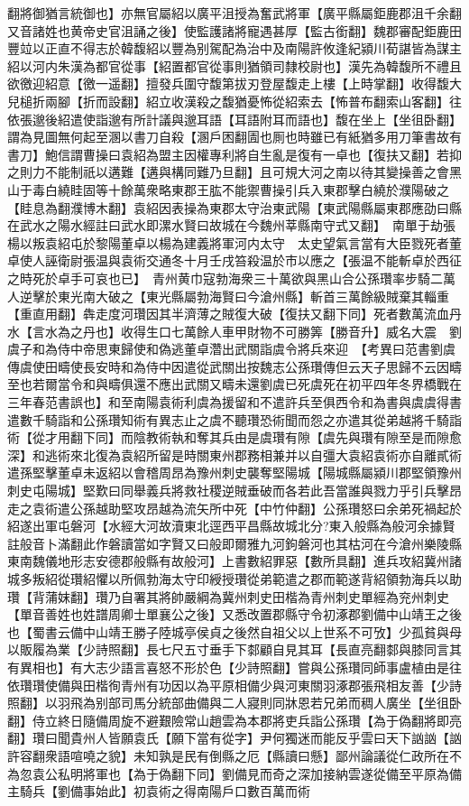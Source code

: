 翻將御猶言統御也】亦無官屬紹以廣平沮授為奮武將軍【廣平縣屬鉅鹿郡沮千余翻又音諸姓也黄帝史官沮誦之後】使監護諸將寵遇甚厚【監古銜翻】魏郡審配鉅鹿田豐竝以正直不得志於韓馥紹以豐為别駕配為治中及南陽許攸逢紀潁川荀諶皆為謀主紹以河内朱漢為都官從事【紹置都官從事則猶領司隸校尉也】漢先為韓馥所不禮且欲徼迎紹意【徼一遥翻】擅發兵圍守馥第拔刃登屋馥走上樓【上時掌翻】收得馥大兒槌折兩腳【折而設翻】紹立收漢殺之馥猶憂怖從紹索去【怖普布翻索山客翻】往依張邈後紹遣使詣邈有所計議與邈耳語【耳語附耳而語也】馥在坐上【坐徂卧翻】謂為見圖無何起至溷以書刀自殺【溷戶困翻圊也厠也時雖已有紙猶多用刀筆書故有書刀】鮑信謂曹操曰袁紹為盟主因權專利將自生亂是復有一卓也【復扶又翻】若抑之則力不能制祇以遘難【遘與構同難乃旦翻】且可規大河之南以待其變操善之會黑山于毒白繞眭固等十餘萬衆略東郡王肱不能禦曹操引兵入東郡擊白繞於濮陽破之【眭息為翻濮博木翻】袁紹因表操為東郡太守治東武陽【東武陽縣屬東郡應劭曰縣在武水之陽水經註曰武水即漯水賢曰故城在今魏州莘縣南守式又翻】　南單于劫張楊以叛袁紹屯於黎陽董卓以楊為建義將軍河内太守　太史望氣言當有大臣戮死者董卓使人誣衛尉張温與袁術交通冬十月壬戌笞殺温於市以應之【張温不能斬卓於西征之時死於卓手可哀也已】　青州黄巾寇勃海衆三十萬欲與黑山合公孫瓚率步騎二萬人逆擊於東光南大破之【東光縣屬勃海賢曰今滄州縣】斬首三萬餘級賊棄其輜重【重直用翻】犇走度河瓚因其半濟薄之賊復大破【復扶又翻下同】死者數萬流血丹水【言水為之丹也】收得生口七萬餘人車甲財物不可勝筭【勝音升】威名大震　劉虞子和為侍中帝思東歸使和偽逃董卓濳出武關詣虞令將兵來迎　【考異曰范書劉虞傳虞使田疇使長安時和為侍中因遣從武關出按魏志公孫瓚傳但云天子思歸不云因疇至也若爾當令和與疇俱還不應出武關又疇未還劉虞已死虞死在初平四年冬界橋戰在三年春范書誤也】和至南陽袁術利虞為援留和不遣許兵至俱西令和為書與虞虞得書遣數千騎詣和公孫瓚知術有異志止之虞不聽瓚恐術聞而怨之亦遣其從弟越將千騎詣術【從才用翻下同】而陰教術執和奪其兵由是虞瓚有隙【虞先與瓚有隙至是而隙愈深】和逃術來北復為袁紹所留是時關東州郡務相兼并以自彊大袁紹袁術亦自離貳術遣孫堅擊董卓未返紹以會稽周昂為豫州刺史襲奪堅陽城【陽城縣屬潁川郡堅領豫州刺史屯陽城】堅歎曰同舉義兵將救社稷逆賊垂破而各若此吾當誰與戮力乎引兵擊昂走之袁術遣公孫越助堅攻昂越為流矢所中死【中竹仲翻】公孫瓚怒曰余弟死禍起於紹遂出軍屯磐河【水經大河故瀆東北逕西平昌縣故城北分?東入般縣為般河余據賢註般音卜滿翻此作磐讀當如字賢又曰般即爾雅九河鉤磐河也其枯河在今滄州樂陵縣東南魏儀地形志安德郡般縣有故般河】上書數紹罪惡【數所具翻】進兵攻紹冀州諸城多叛紹從瓚紹懼以所佩勃海太守印綬授瓚從弟範遣之郡而範遂背紹領勃海兵以助瓚【背蒲妺翻】瓚乃自署其將帥嚴綱為冀州刺史田楷為青州刺史單經為兖州刺史【單音善姓也姓譜周卿士單襄公之後】又悉改置郡縣守令初涿郡劉備中山靖王之後也【蜀書云備中山靖王勝子陸城亭侯貞之後然自祖父以上世系不可攷】少孤貧與母以販履為業【少詩照翻】長七尺五寸垂手下䣛顧自見其耳【長直亮翻䣛與膝同言其有異相也】有大志少語言喜怒不形於色【少詩照翻】嘗與公孫瓚同師事盧植由是往依瓚瓚使備與田楷徇青州有功因以為平原相備少與河東關羽涿郡張飛相友善【少詩照翻】以羽飛為别部司馬分統部曲備與二人寢則同牀恩若兄弟而稠人廣坐【坐徂卧翻】侍立終日隨備周旋不避艱險常山趙雲為本郡將吏兵詣公孫瓚【為于偽翻將即亮翻】瓚曰聞貴州人皆願袁氏【願下當有從字】尹何獨迷而能反乎雲曰天下訩訩【訩許容翻衆語喧嘵之貌】未知孰是民有倒縣之厄【縣讀曰懸】鄙州論議從仁政所在不為忽袁公私明將軍也【為于偽翻下同】劉備見而奇之深加接納雲遂從備至平原為備主騎兵【劉備事始此】初袁術之得南陽戶口數百萬而術